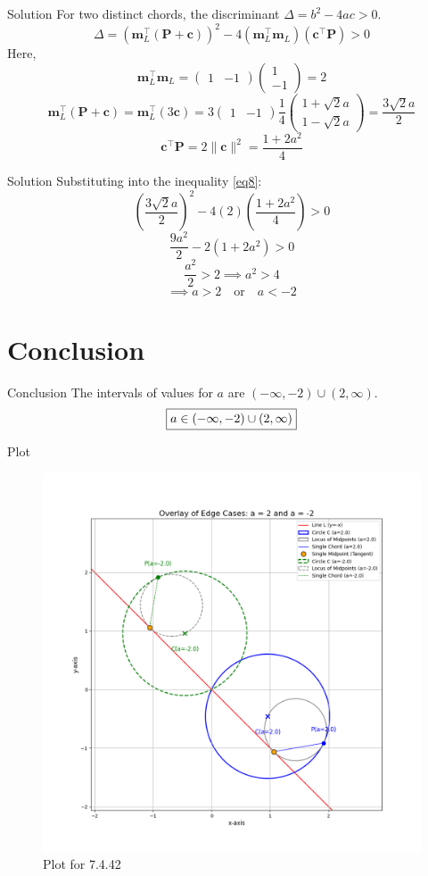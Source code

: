 \documentclass{beamer}
\let\vec\mathbf
\providecommand{\brak}[1]{\ensuremath{\left(#1\right)}}
\theoremstyle{remark}
\newcommand{\myvec}[1]{\ensuremath{\begin{pmatrix}#1\end{pmatrix}}}
\begin{document}
\begin{frame}{Solution}
For two distinct chords, the discriminant $\Delta = b^2 - 4ac > 0$.
\begin{equation}
    \Delta = \brak{\vec{m}_L^{\top}(\vec{P}+\vec{c})}^2 - 4\brak{\vec{m}_L^{\top}\vec{m}_L}\brak{\vec{c}^{\top}\vec{P}} > 0 \label{eq8}
\end{equation}
Here,
\begin{equation}
    \vec{m}_L^{\top}\vec{m}_L = \myvec{1&-1}\myvec{1\\-1} = 2
\end{equation}
\begin{equation}
    \vec{m}_L^{\top}(\vec{P}+\vec{c}) = \vec{m}_L^{\top}(3\vec{c}) = 3\myvec{1&-1}\frac{1}{4}\myvec{1+\sqrt{2}a\\1-\sqrt{2}a} = \frac{3\sqrt{2}a}{2}
\end{equation}
\begin{equation}
    \vec{c}^{\top}\vec{P} = 2\|\vec{c}\|^2 = \frac{1+2a^2}{4}
\end{equation}
\end{frame}

\begin{frame}{Solution}
Substituting into the inequality \eqref{eq8}:
\begin{equation}
    \brak{\frac{3\sqrt{2}a}{2}}^2 - 4(2)\brak{\frac{1+2a^2}{4}} > 0
\end{equation}
\begin{equation}
    \frac{9a^2}{2} - 2(1+2a^2) > 0
\end{equation}
\begin{equation}
    \frac{a^2}{2} > 2 \implies a^2 > 4
\end{equation}
\begin{equation}
    \implies a > 2 \quad \text{or} \quad a < -2
\end{equation}
\end{frame}

\section{Conclusion}
\begin{frame}{Conclusion}
The intervals of values for $a$ are $(-\infty, -2) \cup (2, \infty)$.
\begin{equation}
    \fbox{$a \in (-\infty, -2) \cup (2, \infty)$}
\end{equation}
\end{frame}

\begin{frame}{Plot}
\begin{figure}[H]
    \centering
    \includegraphics[width=0.60\columnwidth]{figs/fig.png}
    \caption{Plot for 7.4.42}
\end{figure}
\end{frame}
\end{document}
